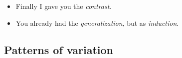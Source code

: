 \begin{frame}
  \begin{remark}
    \begin{itemize}
      \item Finally I gave you the \emph{contrast}.
      \item You already had the \emph{generalization}, but as \emph{induction}.
    \end{itemize}
  \end{remark}
\end{frame}

\begin{frame}
  
  
\end{frame}

\subsection{Patterns of variation}

